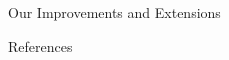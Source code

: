 \documentclass[final,hyperref={pdfpagelabels=false}]{beamer}
\begin{document}
\begin{frame}[t]
\begin{columns}[t]
\begin{column}{.3\textwidth}
\begin{block}{Our Improvements and Extensions}
	\end{block}

    \begin{block}{References}
      \nocite{*} %
      \linespread{0.928}\selectfont
      \footnotesize{
      }
    \end{block}

  \end{column} %

  \begin{column}{.02\textwidth}\end{column} %

\end{columns} %

\end{frame} %
\end{document}
